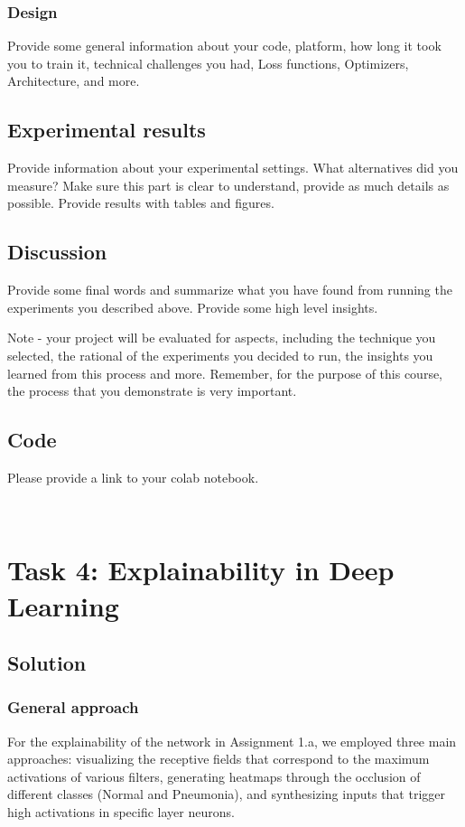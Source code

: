 \documentclass{article}
\begin{document}
\subsubsection{Design}
Provide some general information about your code, platform, how long it took you to train it, technical challenges you had, Loss functions, Optimizers, Architecture, and more.

\subsection{Experimental results}
Provide information about your experimental settings. What alternatives did you measure? Make sure this part is clear to understand, provide as much details as possible. Provide results with tables and figures.

\subsection{Discussion}
Provide some final words and summarize what you have found from running the experiments you described above. Provide some high level insights.

Note - your project will be evaluated for aspects, including the technique you selected, the rational of the experiments you decided to run, the insights you learned from this process and more. Remember, for the purpose of this course, the process that you demonstrate is very  important.

\subsection{Code}

Please provide a link to your colab notebook.


\
\section{Task 4: Explainability in Deep Learning}

\subsection{Solution}
\subsubsection{General approach}
For the explainability of the network in Assignment 1.a, we employed three main approaches: visualizing the receptive fields that correspond to the maximum activations of various filters, generating heatmaps through the occlusion of different classes (Normal and Pneumonia), and synthesizing inputs that trigger high activations in specific layer neurons.
\end{document}
